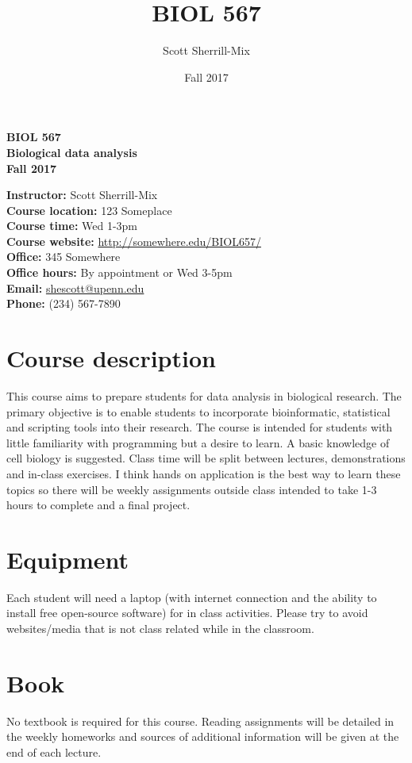 \documentclass[12pt]{article}
\title{BIOL 567}
\date{Fall 2017}
\author{Scott Sherrill-Mix}
\begin{document}
\thispagestyle{plain}
\begin{center}
\Large{\textbf{BIOL 567\\ Biological data analysis}}\\
\Large{\textbf{Fall 2017}}
\end{center}

\noindent
\textbf{Instructor:} Scott Sherrill-Mix\\
\textbf{Course location:} 123 Someplace\\
\textbf{Course time:} Wed 1-3pm\\
\textbf{Course website:} \url{http://somewhere.edu/BIOL657/}\\

\noindent
\textbf{Office:} 345 Somewhere\\
\textbf{Office hours:} By appointment or Wed 3-5pm\\
\textbf{Email:} \href{mailto:shescott@upenn.edu}{shescott@upenn.edu}\\
\textbf{Phone:} (234) 567-7890

\section*{Course description}
This course aims to prepare students for data analysis in biological research. The primary objective is to enable students to incorporate bioinformatic, statistical and scripting tools into their research. The course is intended for students with little familiarity with programming but a desire to learn. A basic knowledge of cell biology is suggested. Class time will be split between lectures, demonstrations and in-class exercises. I think hands on application is the best way to learn these topics so there will be weekly assignments outside class intended to take 1-3 hours to complete and a final project. 

\section*{Equipment}
Each student will need a laptop (with internet connection and the ability to install free open-source software) for in class activities. Please try to avoid websites/media that is not class related while in the classroom. 

\section*{Book}
No textbook is required for this course. Reading assignments will be detailed in the weekly homeworks and sources of additional information will be given at the end of each lecture.
\end{document}
